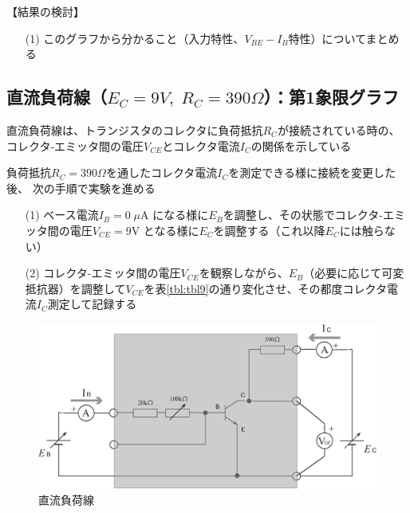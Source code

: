 \documentclass[uplatex,a4paper,11pt,oneside,openany]{jsbook}
\begin{document}
【結果の検討】

\begin{enumerate}
	\item[(1)] このグラフから分かること（入力特性、$V_{BE}-I_B$特性）についてまとめる
\end{enumerate}

\newpage

\subsection{直流負荷線（$E_C=9V,\;R_C=390\Omega$）：第1象限グラフ}

直流負荷線は、トランジスタのコレクタに負荷抵抗$R_C$が接続されている時の、
コレクタ-エミッタ間の電圧$V_{CE}$とコレクタ電流$I_C$の関係を示している


負荷抵抗$R_C=390\Omega$を通したコレクタ電流$I_C$を測定できる様に接続を変更した後、
次の手順で実験を進める

\begin{enumerate}
\item[(1)] ベース電流$I_B=0\;\mu$A になる様に$E_B$を調整し、その状態でコレクタ-エミッタ間の電圧$V_{CE}=9$V となる様に$E_C$を調整する（これ以降$E_C$には触らない）
\item[(2)] コレクタ-エミッタ間の電圧$V_{CE}$を観察しながら、$E_B$（必要に応じて可変抵抗器）を調整して$V_{CE}$を表\ref{tbl:tbl9}の通り変化させ、その都度コレクタ電流$I_C$測定して記録する  
\end{enumerate}



\begin{figure}[H]
  \centering
   \includegraphics[keepaspectratio, scale=0.45, angle=0]
               {figs/eps/ex4.eps}
               \caption{直流負荷線}
               \label{fig:ex3}
\end{figure}
\end{document}
